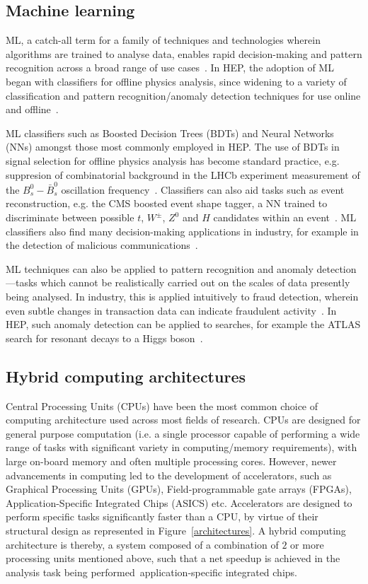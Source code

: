 \subsection{Machine learning}
\label{machine-learning}
ML, a catch-all term for a family of techniques and technologies wherein algorithms are trained to analyse data, enables rapid decision-making and pattern recognition across a broad range of use cases~\cite{intro-ml}. In HEP, the adoption of ML began with classifiers for offline physics analysis, since widening to a variety of classification and pattern recognition/anomaly detection techniques for use online and offline~\cite{albertsson-ml}.

ML classifiers such as Boosted Decision Trees (BDTs) and Neural Networks (NNs) amongst those most commonly employed in HEP. The use of BDTs in signal selection for offline physics analysis has become standard practice, e.g. suppresion of combinatorial background in the LHCb experiment measurement of the $B_s^0-\bar{B}_s^0$ oscillation frequency~\cite{delta-ms}. Classifiers can also aid tasks such as event reconstruction, e.g. the CMS boosted event shape tagger, a NN trained to discriminate between possible $t$, $W^\pm$, $Z^0$ and $H$ candidates within an event~\cite{CMS-best}. ML classifiers also find many decision-making applications in industry, for example in the detection of malicious communications~\cite{classifier-phishing}.

ML techniques can also be applied to pattern recognition and anomaly detection—tasks which cannot be realistically carried out on the scales of data presently being analysed. In industry, this is applied intuitively to fraud detection, wherein even subtle changes in transaction  data can indicate fraudulent activity~\cite{fraud-detection}. In HEP, such anomaly detection can be applied to searches, for example the ATLAS search for resonant decays to a Higgs boson~\cite{anomaly-hep}.

\subsection{Hybrid computing architectures}
\label{hybrid-architectures}
Central Processing Units (CPUs) have been the most common choice of computing architecture used across most fields of research. CPUs are designed for general purpose computation (i.e. a single processor capable of performing a wide range of tasks with significant variety in computing/memory requirements), with large on-board memory and often multiple processing cores. However, newer advancements in computing led to the development of accelerators, such as Graphical Processing Units (GPUs), Field-programmable gate arrays (FPGAs), Application-Specific Integrated Chips (ASICS) etc. Accelerators are designed to perform specific tasks significantly faster than a CPU, by virtue of their structural design as represented in Figure~\ref{architectures}. A hybrid computing architecture is thereby, a system composed of a combination of $2$ or more processing units mentioned above, such that a net speedup is achieved in the analysis task being performed~\cite{architectures}application-specific integrated chips.


